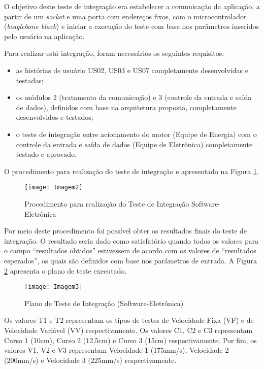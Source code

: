 		O objetivo deste teste de integração era estabelecer a comunicação da aplicação, a partir de um \textit{socket} e uma porta com endereços fixos, com o microcontrolador (\textit{beaglebone black}) e iniciar a execução do teste com base nos parâmetros inseridos pelo usuário na aplicação.
		
		Para realizar está integração, foram necessários os seguintes requisitos:

		\begin{itemize}
			\item as histórias de usuário US02, US03 e US07 completamente desenvolvidas e testadas;
			\item os módulos 2 (tratamento da comunicação) e 3 (controle da entrada e saída de dados), definidos com base na arquitetura proposta, completamente desenvolvidos e testados;
			\item o teste de integração entre acionamento do motor (Equipe de Energia) com o controle da entrada e saída de dados (Equipe de Eletrônica) completamente testado e aprovado.
		\end{itemize}

		O procedimento para realização do teste de integração e apresentado na Figura \ref{Imagem2}.
		\begin{figure}[htpb]
			\centering
			\texttt{[image: Imagem2]}
			\caption{Procedimento para realização do Teste de Integração Software-Eletrônica}
			\label{Imagem2}
		\end{figure}

		Por meio deste procedimento foi possível obter os resultados finais do teste de integração. O resultado seria dado como satisfatório quando todos os valores para o campo “resultados obtidos” estivessem de acordo com os valores de “resultados esperados”, os quais são definidos com base nos parâmetros de entrada. A Figura \ref{Imagem3} apresenta o plano de teste executado.
		\newpage
		\begin{figure}[htpb]
			\centering
			\texttt{[image: Imagem3]}
			\caption{Plano de Teste de Integração (Software-Eletrônica)}
			\label{Imagem3}
		\end{figure}

		Os valores T1 e T2 representam os tipos de testes de Velocidade Fixa (VF) e de Velocidade Variável (VV) respectivamente. Os valores C1, C2 e C3 representam Curso 1 (10cm), Curso 2 (12,5cm) e Curso 3 (15cm) respectivamente. Por fim, os valores V1, V2 e V3 representam Velocidade 1 (175mm/s), Velocidade 2 (200mm/s) e Velocidade 3 (225mm/s) respectivamente.

